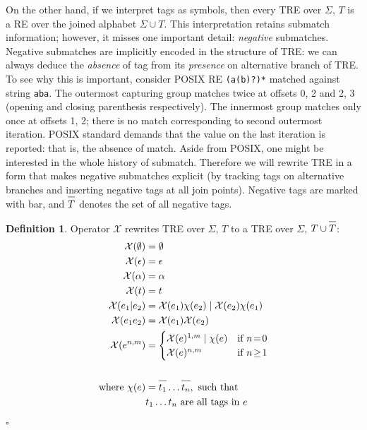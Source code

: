 \documentclass{article}
\newcommand{\Xeq}{\!=\!}
\newcommand{\XX}{\mathcal{X}}
\newcommand*{\Xbar}[1]{\overline{#1\vphantom{\bar{#1}}}}
\theoremstyle{definition}
\newtheorem{Xdef}{Definition}
\begin{document}
\begin{multicols}{2}
On the other hand, if we interpret tags as symbols, then every TRE over $\Sigma$, $T$ is a RE over the joined alphabet $\Sigma \cup T$.
This interpretation retains submatch information; however, it misses one important detail: \emph{negative} submatches.
Negative submatches are implicitly encoded in the structure of TRE:
we can always deduce the \emph{absence} of tag from its \emph{presence} on alternative branch of TRE.
To see why this is important, consider POSIX RE \texttt{(a(b)?)*} matched against string \texttt{aba}.
The outermost capturing group matches twice at offsets 0, 2 and 2, 3 (opening and closing parenthesis respectively).
The innermost group matches only once at offsets 1, 2; there is no match corresponding to second outermost iteration.
POSIX standard demands that the value on the last iteration is reported: that is, the absence of match.
Aside from POSIX, one might be interested in the whole history of submatch.
Therefore we will rewrite TRE in a form that makes negative submatches explicit
(by tracking tags on alternative branches and inserting negative tags at all join points).
Negative tags are marked with bar, and $\Xbar{T}$ denotes the set of all negative tags.

    \begin{Xdef}\label{deftlang}
    Operator $\XX$ rewrites TRE over $\Sigma$, $T$ to a TRE over $\Sigma$, $T \cup \Xbar{T}$:
    \begin{align*}
        \XX(\emptyset) &= \emptyset \\
        \XX(\epsilon) &= \epsilon \\
        \XX(\alpha) &= \alpha \\
        \XX(t) &= t \\
        \XX(e_1 | e_2)
            &=      \XX(e_1) \chi(e_2) \mid \XX(e_2) \chi(e_1) \\
        \XX(e_1 e_2) &= \XX(e_1) \XX(e_2) \\
        \XX(e^{n,m}) &= \begin{cases}
                \XX(e)^{1,m} \mid \chi(e) &\text{if } n \Xeq 0 \\
                \XX(e)^{n,m} &\text{if } n \!\geq\! 1
            \end{cases} \\
        \\
        \text{where }
            \chi(e) &= \Xbar{t_1} \dots \Xbar{t_n}, \text{ such that} \\
                &t_1 \dots t_n \text{ are all tags in } e
    \end{align*}
    $\square$
    \end{Xdef}


\end{multicols}
\end{document}
